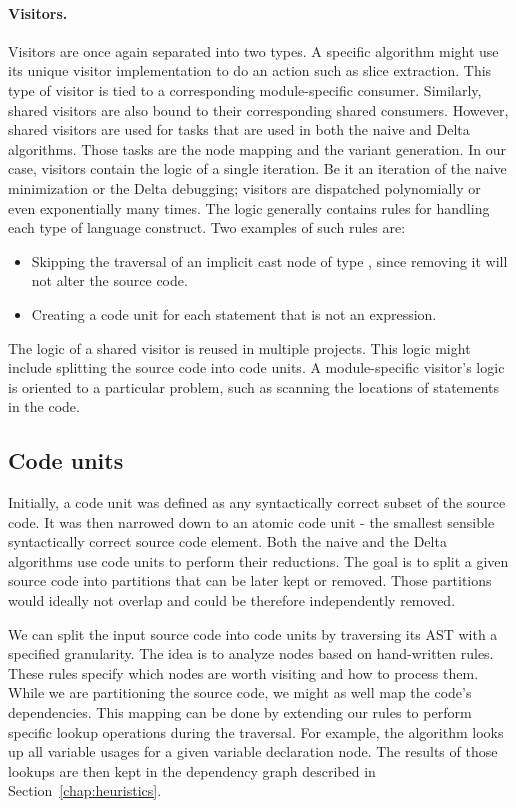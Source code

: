 \paragraph{Visitors.} Visitors are once again separated into two types. 
A specific algorithm might use its unique visitor implementation to do 
an action such as slice extraction. 
This type of visitor is tied to a corresponding module-specific consumer. 
Similarly, shared visitors are also bound to their corresponding shared 
consumers. 
However, shared visitors are used for tasks that are used in both the naive 
and Delta algorithms. 
Those tasks are the node mapping and the variant generation. 
In our case, visitors contain the logic of a single iteration. 
Be it an iteration of the naive minimization or the Delta debugging; 
visitors are dispatched polynomially or even exponentially many times. 
The logic generally contains rules for handling each type of language 
construct. 
Two examples of such rules are:
\begin{itemize}
  \item Skipping the traversal of an implicit cast node of type 
  , since removing it will not alter the source code.
  \item Creating a code unit for each statement that is not an expression.
\end{itemize}
The logic of a shared visitor is reused in multiple projects. 
This logic might include splitting the source code into code units. 
A module-specific visitor's logic is oriented to a particular problem, 
such as scanning the locations of statements in the code.

\subsection*{Code units}

Initially, a code unit was defined as any syntactically correct subset of 
the source code. 
It was then narrowed down to an atomic code unit - the smallest sensible 
syntactically correct source code element. 
Both the naive and the Delta algorithms use code units to perform their 
reductions. 
The goal is to split a given source code into partitions that can be later 
kept or removed. 
Those partitions would ideally not overlap and could be therefore 
independently removed.

We can split the input source code into code units by traversing its AST 
with a specified granularity. 
The idea is to analyze nodes based on hand-written rules. 
These rules specify which nodes are worth visiting and how to process them. 
While we are partitioning the source code, we might as well map the code's 
dependencies. 
This mapping can be done by extending our rules to perform specific lookup 
operations during the traversal. 
For example, the algorithm looks up all variable usages for a given variable 
declaration node. 
The results of those lookups are then kept in the dependency graph described 
in Section~\ref{chap:heuristics}.

